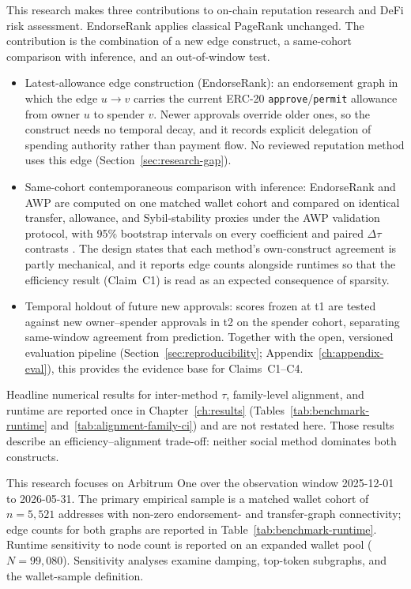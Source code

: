 This research makes three contributions to on-chain reputation research and DeFi risk assessment. EndorseRank applies classical PageRank  unchanged. The contribution is the combination of a new edge construct, a same-cohort comparison with inference, and an out-of-window test.
\begin{itemize}
\item Latest-allowance edge construction (EndorseRank): an endorsement graph in which the edge $u\to v$ carries the current ERC-20 \texttt{approve}/\texttt{permit} allowance from owner $u$ to spender $v$. Newer approvals override older ones, so the construct needs no temporal decay, and it records explicit delegation of spending authority rather than payment flow. No reviewed reputation method uses this edge (Section~\ref{sec:research-gap}).
\item Same-cohort contemporaneous comparison with inference: EndorseRank and AWP are computed on one matched wallet cohort and compared on identical transfer, allowance, and Sybil-stability proxies under the AWP validation protocol, with 95\% bootstrap intervals on every coefficient and paired $\Delta\tau$ contrasts . The design states that each method's own-construct agreement is partly mechanical, and it reports edge counts alongside runtimes so that the efficiency result (Claim~C1) is read as an expected consequence of sparsity.
\item Temporal holdout of future new approvals: scores frozen at t1 are tested against new owner--spender approvals in t2 on the spender cohort, separating same-window agreement from prediction. Together with the open, versioned evaluation pipeline (Section~\ref{sec:reproducibility}; Appendix~\ref{ch:appendix-eval}), this provides the evidence base for Claims~C1--C4.
\end{itemize}

Headline numerical results for inter-method $\tau$, family-level alignment, and runtime are reported once in Chapter~\ref{ch:results} (Tables~\ref{tab:benchmark-runtime} and~\ref{tab:alignment-family-ci}) and are not restated here. Those results describe an efficiency--alignment trade-off: neither social method dominates both constructs.


This research focuses on Arbitrum One over the observation window 2025-12-01 to 2026-05-31. The primary empirical sample is a matched wallet cohort of $n=5{,}521$ addresses with non-zero endorsement- and transfer-graph connectivity; edge counts for both graphs are reported in Table~\ref{tab:benchmark-runtime}. Runtime sensitivity to node count is reported on an expanded wallet pool ($N=99{,}080$). Sensitivity analyses examine damping, top-token subgraphs, and the wallet-sample definition.

